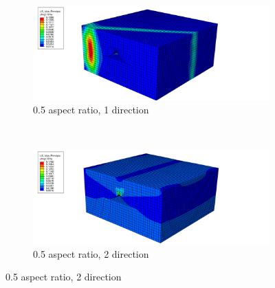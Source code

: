 \begin{figure}
  \begin{subfigure}[b]{0.70\textwidth}
    \includegraphics[width=\textwidth]{chapter_7_non-elasticmodelling/figures/05p1.png}
    \caption{0.5 aspect ratio, 1 direction}
  \end{subfigure}
  \\
    \begin{subfigure}[b]{0.70\textwidth}
    \includegraphics[width=\textwidth]{chapter_7_non-elasticmodelling/figures/05p2.png}
    \caption{0.5 aspect ratio, 2 direction}
  \end{subfigure}
  \end{figure}
  \\
